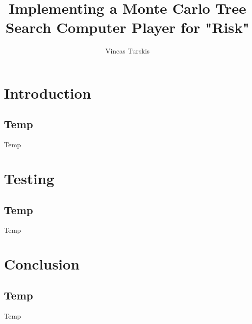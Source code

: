 \documentclass[11pt,a4paper]{report}
\author{Vincas Turskis}
\title{Implementing a Monte Carlo Tree Search Computer Player for "Risk"}
\begin{document}
\maketitle
\tableofcontents
\chapter{Introduction}
\section{Temp}
Temp







\chapter{Testing}
\section{Temp}
Temp

\chapter{Conclusion}
\section{Temp}
Temp

\printbibliography
\end{document}

